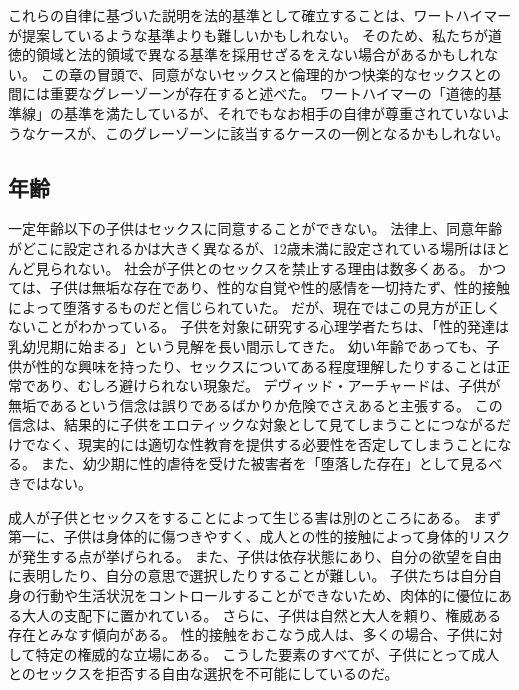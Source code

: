 \documentclass[paper=a4,book,openany]{jlreq}
\begin{document}
これらの自律に基づいた説明を法的基準として確立することは、ワートハイマーが提案しているような基準よりも難しいかもしれない。
そのため、私たちが道徳的領域と法的領域で異なる基準を採用せざるをえない場合があるかもしれない。
この章の冒頭で、同意がないセックスと倫理的かつ快楽的なセックスとの間には重要なグレーゾーンが存在すると述べた。
ワートハイマーの「道徳的基準線」の基準を満たしているが、それでもなお相手の自律が尊重されていないようなケースが、このグレーゾーンに該当するケースの一例となるかもしれない。

\subsection{年齢}

一定年齢以下の子供はセックスに同意することができない。
法律上、同意年齢がどこに設定されるかは大きく異なるが、12歳未満に設定されている場所はほとんど見られない。
社会が子供とのセックスを禁止する理由は数多くある。
かつては、子供は無垢な存在であり、性的な自覚や性的感情を一切持たず、性的接触によって堕落するものだと信じられていた。
だが、現在ではこの見方が正しくないことがわかっている。
子供を対象に研究する心理学者たちは、「性的発達は乳幼児期に始まる」という見解を長い間示してきた\citep{louie19:_sexual_behav_child}。
幼い年齢であっても、子供が性的な興味を持ったり、セックスについてある程度理解したりすることは正常であり、むしろ避けられない現象だ。
デヴィッド・アーチャードは、子供が無垢であるという信念は誤りであるばかりか危険でさえあると主張する。
この信念は、結果的に子供をエロティックな対象として見てしまうことにつながるだけでなく、現実的には適切な性教育を提供する必要性を否定してしまうことになる\citep[pp.118--119]{archard98:_sexual_consen}。
また、幼少期に性的虐待を受けた被害者を「堕落した存在」として見るべきではない。

成人が子供とセックスをすることによって生じる害は別のところにある。
まず第一に、子供は身体的に傷つきやすく、成人との性的接触によって身体的リスクが発生する点が挙げられる。
また、子供は依存状態にあり、自分の欲望を自由に表明したり、自分の意思で選択したりすることが難しい。
子供たちは自分自身の行動や生活状況をコントロールすることができないため、肉体的に優位にある大人の支配下に置かれている。
さらに、子供は自然と大人を頼り、権威ある存在とみなす傾向がある。
性的接触をおこなう成人は、多くの場合、子供に対して特定の権威的な立場にある。
こうした要素のすべてが、子供にとって成人とのセックスを拒否する自由な選択を不可能にしているのだ。
\end{document}
